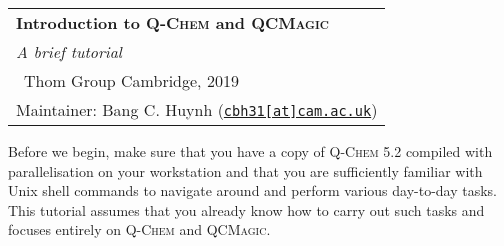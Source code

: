 \documentclass[%
	11pt,%
	oneside,%
	DIV=15,%
	BCOR=0mm,%
	headinclude=true,%
	footinclude=true,%
	parskip=half,%
	headsepline
]{scrartcl}
\begin{document}
	\vspace{1cm}
	\noindent
	\bgroup
	\renewcommand\arraystretch{1.5} \begin{tabular*}{\linewidth}{>{\centering\arraybackslash}m{\linewidth}}
		\hline
		\textbf{\Large Introduction to \textsc{Q-Chem} and \textsc{QCMagic}}\\
		\textit{\large A brief tutorial}\\
		\textcopyright\, Thom Group Cambridge, 2019\\[-8pt]
		Maintainer: Bang C. Huynh (\href{mailto:cbh31@cam.ac.uk}{\texttt{cbh31[at]cam.ac.uk}})\\
		\hline
	\end{tabular*}
	\egroup
	
	\setcounter{tocdepth}{2}
	\tableofcontents
	
	
	Before we begin, make sure that you have a copy of \textsc{Q-Chem} 5.2 compiled with parallelisation on your workstation and that you are sufficiently familiar with Unix shell commands to navigate around and perform various day-to-day tasks.
	This tutorial assumes that you already know how to carry out such tasks and focuses entirely on \textsc{Q-Chem} and \textsc{QCMagic}.
	
	\clearpage
	
	
	
	\clearpage
	\printbibliography[title={References}]
\end{document}
